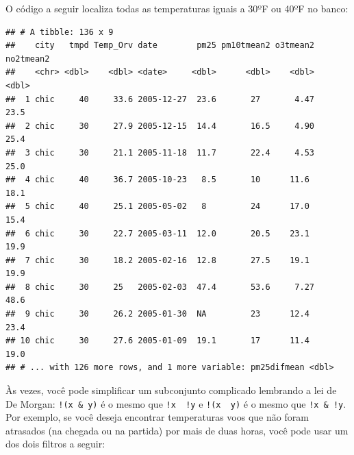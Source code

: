 \documentclass[]{book}
\newenvironment{Shaded}{\begin{snugshade}}{\end{snugshade}}
\newcommand{\DecValTok}[1]{\textcolor[rgb]{0.00,0.00,0.81}{#1}}
\newcommand{\KeywordTok}[1]{\textcolor[rgb]{0.13,0.29,0.53}{\textbf{#1}}}
\newcommand{\NormalTok}[1]{#1}
\newcommand{\OperatorTok}[1]{\textcolor[rgb]{0.81,0.36,0.00}{\textbf{#1}}}
\newcommand{\StringTok}[1]{\textcolor[rgb]{0.31,0.60,0.02}{#1}}
\begin{document}
O código a seguir localiza todas as temperaturas iguais a 30ºF ou 40ºF no banco:

\begin{Shaded}
\end{Shaded}

\begin{verbatim}
## # A tibble: 136 x 9
##    city   tmpd Temp_Orv date        pm25 pm10tmean2 o3tmean2 no2tmean2
##    <chr> <dbl>    <dbl> <date>     <dbl>      <dbl>    <dbl>     <dbl>
##  1 chic     40     33.6 2005-12-27  23.6       27       4.47      23.5
##  2 chic     30     27.9 2005-12-15  14.4       16.5     4.90      25.4
##  3 chic     30     21.1 2005-11-18  11.7       22.4     4.53      25.0
##  4 chic     40     36.7 2005-10-23   8.5       10      11.6       18.1
##  5 chic     40     25.1 2005-05-02   8         24      17.0       15.4
##  6 chic     30     22.7 2005-03-11  12.0       20.5    23.1       19.9
##  7 chic     30     18.2 2005-02-16  12.8       27.5    19.1       19.9
##  8 chic     30     25   2005-02-03  47.4       53.6     7.27      48.6
##  9 chic     30     26.2 2005-01-30  NA         23      12.4       23.4
## 10 chic     30     27.6 2005-01-09  19.1       17      11.4       19.0
## # ... with 126 more rows, and 1 more variable: pm25difmean <dbl>
\end{verbatim}

Às vezes, você pode simplificar um subconjunto complicado lembrando a lei de De Morgan: \texttt{!(x\ \&\ y)} é o mesmo que \texttt{!x\ \textbar{}\ !y} e \texttt{!(x\ \textbar{}\ y)} é o mesmo que \texttt{!x\ \&\ !y}. Por exemplo, se você deseja encontrar temperaturas voos que não foram atrasados (na chegada ou na partida) por mais de duas horas, você pode usar um dos dois filtros a seguir:

\begin{Shaded}
\end{Shaded}
\end{document}
